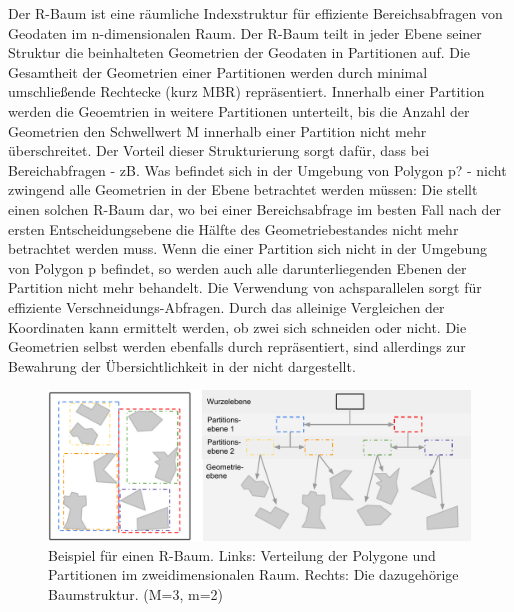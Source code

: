 \documentclass[runningheads,a4paper]{llncs}
\begin{document}
Der R-Baum ist eine räumliche Indexstruktur für effiziente Bereichsabfragen von Geodaten im n-dimensionalen Raum. Der R-Baum teilt in jeder Ebene seiner Struktur die beinhalteten Geometrien der Geodaten in Partitionen auf. Die Gesamtheit der Geometrien einer Partitionen werden durch minimal umschließende Rechtecke (kurz \acs{MBR}) repräsentiert. 
Innerhalb einer Partition werden die Geoemtrien in weitere Partitionen unterteilt, bis die Anzahl der Geometrien den Schwellwert \acs{M} innerhalb einer Partition nicht mehr überschreitet. Der Vorteil dieser Strukturierung sorgt dafür, dass bei Bereichabfragen - zB. Was befindet sich in der Umgebung von Polygon p? - nicht zwingend alle 
Geometrien in der Ebene betrachtet werden müssen: Die  stellt einen solchen R-Baum dar, wo bei einer Bereichsabfrage im besten Fall nach der ersten Entscheidungsebene die Hälfte des Geometriebestandes nicht mehr betrachtet werden muss. Wenn die  einer Partition sich nicht in der Umgebung von Polygon p befindet, so werden auch alle darunterliegenden Ebenen der Partition nicht mehr behandelt. Die Verwendung von achsparallelen  sorgt für effiziente Verschneidungs-Abfragen. Durch das alleinige Vergleichen der Koordinaten kann ermittelt werden, ob zwei  sich schneiden oder nicht. Die Geometrien selbst werden ebenfalls durch  repräsentiert, sind allerdings zur Bewahrung der Übersichtlichkeit in der  nicht dargestellt.
\begin{figure}[H]
		\begin{center}
		\includegraphics[width=1.0\textwidth ]{001_Beispiel_R-Tree.pdf}
		\caption{Beispiel für einen R-Baum. Links: Verteilung der Polygone und Partitionen im zweidimensionalen Raum. Rechts: Die dazugehörige Baumstruktur. (\acs{M}=3, \acs{m}=2)}
		\label{fig:beispiel-r-tree}
		\end{center}
	\end{figure}
\end{document}
